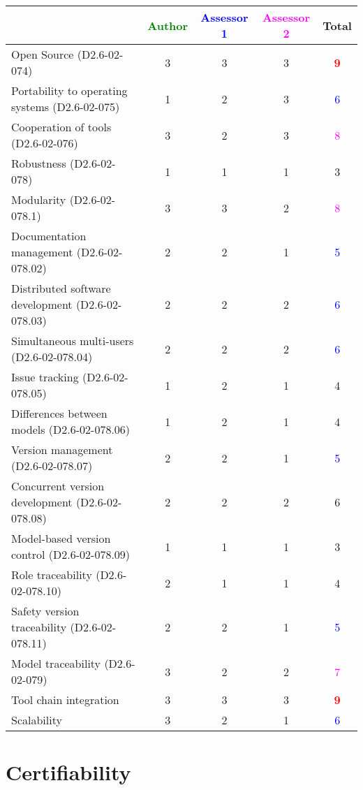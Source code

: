 \begin{tabular}{|l | c | c | c | c|}
\hline
& \textcolor{green}{Author} & \textcolor{blue}{Assessor 1} & \textcolor{magenta}{Assessor 2} & Total \\
\hline
Open Source (D2.6-02-074) & 3    & 3    & 3    & \textcolor{red}{\textbf{9}} \\
\hline
Portability to operating systems (D2.6-02-075) & 1    & 2    &  3 & \textcolor{blue}{6} \\
\hline
Cooperation of tools (D2.6-02-076) & 3    & 2    & 3    & \textcolor{magenta}{8} \\
\hline
Robustness (D2.6-02-078) & 1    & 1    & 1    & 3    \\
\hline
Modularity (D2.6-02-078.1) & 3    & 3    & 2    & \textcolor{magenta}{8} \\
\hline
Documentation management (D2.6-02-078.02) & 2    & 2    & 1     & \textcolor{blue}{5} \\
\hline
Distributed software development (D2.6-02-078.03) & 2    & 2    & 2    & \textcolor{blue}{6} \\
\hline
Simultaneous multi-users (D2.6-02-078.04) & 2    & 2    & 2    & \textcolor{blue}{6} \\
\hline
Issue tracking (D2.6-02-078.05) & 1    & 2    & 1    & 4    \\
\hline
Differences between models (D2.6-02-078.06) & 1    & 2    & 1    & 4    \\
\hline
Version management (D2.6-02-078.07) & 2    & 2    & 1    & \textcolor{blue}{5} \\
\hline
Concurrent version development (D2.6-02-078.08) & 2    & 2    & 2    &  6\\
\hline
Model-based version control (D2.6-02-078.09) & 1    & 1    & 1    & 3    \\
\hline
Role traceability (D2.6-02-078.10) & 2    & 1    & 1    & 4    \\
\hline
Safety version traceability (D2.6-02-078.11) & 2    & 2    & 1    & \textcolor{blue}{5} \\
\hline
Model traceability (D2.6-02-079) & 3    & 2    & 2    & \textcolor{magenta}{7} \\
\hline
Tool chain integration & 3    & 3    & 3    & \textcolor{red}{\textbf{9}} \\
\hline
Scalability & 3    & 2    & 1    & \textcolor{blue}{6} \\
\hline
\end{tabular}

\section{Certifiability}

